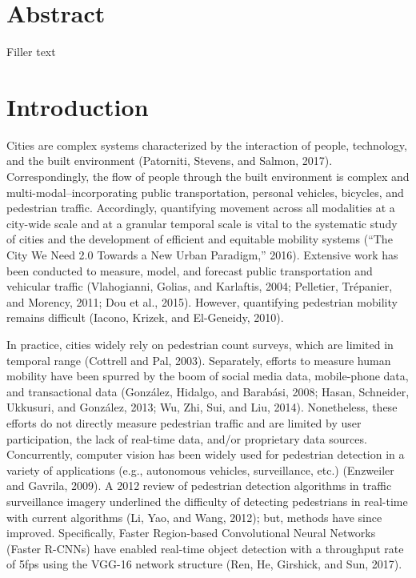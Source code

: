 \documentclass[10pt,letterpaper]{article}
\begin{document}
\section*{Abstract}
Filler text



\linenumbers

\section*{Introduction}

Cities are complex systems characterized by the interaction of people, technology, and the built environment (Patorniti, Stevens, and Salmon, 2017). Correspondingly, the flow of people through the built environment is complex and multi-modal--incorporating public transportation, personal vehicles, bicycles, and pedestrian traffic. Accordingly, quantifying movement across all modalities at a city-wide scale and at a granular temporal scale is vital to the systematic study of cities and the development of efficient and equitable mobility systems (“The City We Need 2.0 Towards a New Urban Paradigm,” 2016). Extensive work has been conducted to measure, model, and forecast public transportation and vehicular traffic (Vlahogianni, Golias, and Karlaftis, 2004; Pelletier, Trépanier, and Morency, 2011; Dou et al., 2015). However, quantifying pedestrian mobility remains difficult (Iacono, Krizek, and El-Geneidy, 2010).

In practice, cities widely rely on pedestrian count surveys, which are limited in temporal range (Cottrell and Pal, 2003). Separately, efforts to measure human mobility have been spurred by the boom of social media data, mobile-phone data, and transactional data (González, Hidalgo, and Barabási, 2008; Hasan, Schneider, Ukkusuri, and González, 2013; Wu, Zhi, Sui, and Liu, 2014). Nonetheless, these efforts do not directly measure pedestrian traffic and are limited by user participation, the lack of real-time data, and/or proprietary data sources. Concurrently, computer vision has been widely used for pedestrian detection in a variety of applications (e.g., autonomous vehicles, surveillance, etc.) (Enzweiler and Gavrila, 2009). A 2012 review of pedestrian detection algorithms in traffic surveillance imagery underlined the difficulty of detecting pedestrians in real-time with current algorithms (Li, Yao, and Wang, 2012); but, methods have since improved. Specifically, Faster Region-based Convolutional Neural Networks (Faster R-CNNs) have enabled real-time object detection with a throughput rate of 5fps using the VGG-16 network structure (Ren, He, Girshick, and Sun, 2017).
\end{document}
